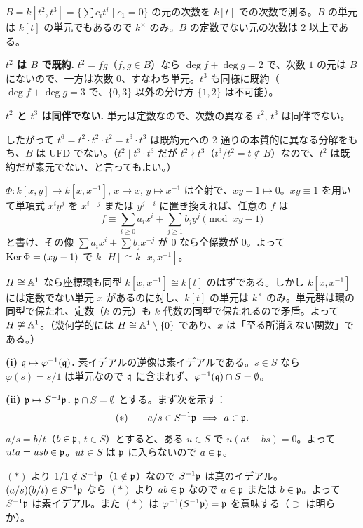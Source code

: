 $B=k[t^2,t^3]=\{\sum c_it^i\mid c_1=0\}$ の元の次数を $k[t]$ での次数で測る。$B$ の単元は $k[t]$ の単元でもあるので $k^\times$ のみ。$B$ の定数でない元の次数は $2$ 以上である。

\textbf{$t^2$ は $B$ で既約.} $t^2=fg$（$f,g\in B$）なら $\deg f+\deg g=2$ で、次数 $1$ の元は $B$ にないので、一方は次数 $0$、すなわち単元。$t^3$ も同様に既約（$\deg f+\deg g=3$ で、$\{0,3\}$ 以外の分け方 $\{1,2\}$ は不可能）。

\textbf{$t^2$ と $t^3$ は同伴でない.} 単元は定数なので、次数の異なる $t^2$, $t^3$ は同伴でない。

したがって $t^6=t^2\cdot t^2\cdot t^2=t^3\cdot t^3$ は既約元への $2$ 通りの本質的に異なる分解をもち、$B$ は UFD でない。（$t^2\mid t^3\cdot t^3$ だが $t^2\nmid t^3$（$t^3/t^2=t\notin B$）なので、$t^2$ は既約だが素元でない、と言ってもよい。）

$\Phi:k[x,y]\to k[x,x^{-1}]$, $x\mapsto x$, $y\mapsto x^{-1}$ は全射で、$xy-1\mapsto0$。$xy\equiv1$ を用いて単項式 $x^iy^j$ を $x^{i-j}$ または $y^{j-i}$ に置き換えれば、任意の $f$ は
\[
  f\equiv\sum_{i\geq0}a_ix^i+\sum_{j\geq1}b_jy^j\pmod{xy-1}
\]
と書け、その像 $\sum a_ix^i+\sum b_jx^{-j}$ が $0$ なら全係数が $0$。よって $\operatorname{Ker}\Phi=(xy-1)$ で $k[H]\cong k[x,x^{-1}]$。

$H\cong\mathbb{A}^1$ なら座標環も同型 $k[x,x^{-1}]\cong k[t]$ のはずである。しかし $k[x,x^{-1}]$ には定数でない単元 $x$ があるのに対し、$k[t]$ の単元は $k^\times$ のみ。単元群は環の同型で保たれ、定数（$k$ の元）も $k$ 代数の同型で保たれるので矛盾。よって $H\not\cong\mathbb{A}^1$。（幾何学的には $H\cong\mathbb{A}^1\setminus\{0\}$ であり、$x$ は「至る所消えない関数」である。）

\textbf{(i) $\mathfrak{q}\mapsto\varphi^{-1}(\mathfrak{q})$.} 素イデアルの逆像は素イデアルである。$s\in S$ なら $\varphi(s)=s/1$ は単元なので $\mathfrak{q}$ に含まれず、$\varphi^{-1}(\mathfrak{q})\cap S=\emptyset$。

\textbf{(ii) $\mathfrak{p}\mapsto S^{-1}\mathfrak{p}$.} $\mathfrak{p}\cap S=\emptyset$ とする。まず次を示す：
\[
  (\ast)\qquad a/s\in S^{-1}\p\ \Longrightarrow\ a\in\p.
\]
$a/s=b/t$（$b\in\mathfrak{p}$, $t\in S$）とすると、ある $u\in S$ で $u(at-bs)=0$。よって $uta=usb\in\mathfrak{p}$。$ut\in S$ は $\mathfrak{p}$ に入らないので $a\in\mathfrak{p}$。

$(\ast)$ より $1/1\notin S^{-1}\mathfrak{p}$（$1\notin\mathfrak{p}$）なので $S^{-1}\mathfrak{p}$ は真のイデアル。$(a/s)(b/t)\in S^{-1}\mathfrak{p}$ なら $(\ast)$ より $ab\in\mathfrak{p}$ なので $a\in\mathfrak{p}$ または $b\in\mathfrak{p}$。よって $S^{-1}\mathfrak{p}$ は素イデアル。また $(\ast)$ は $\varphi^{-1}(S^{-1}\mathfrak{p})=\mathfrak{p}$ を意味する（$\supset$ は明らか）。

